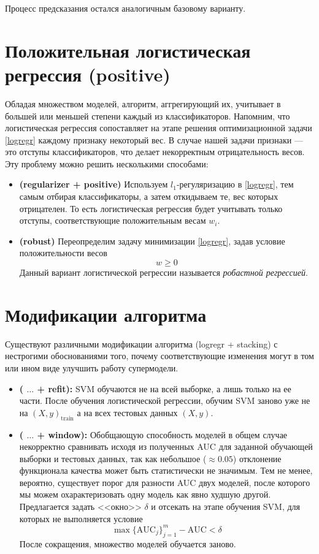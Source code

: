 \documentclass[12pt,twoside]{article}
\theoremstyle{plain}
\theoremstyle{remark}
\theoremstyle{definition}
\begin{document}
Процесс предсказания остался аналогичным базовому варианту. 

\section{Положительная логистическая регрессия (positive)}

Обладая множеством моделей, алгоритм, аггрегирующий их, учитывает в большей или меньшей степени каждый из классификаторов. Напомним, что логистическая регрессия сопоставляет на этапе решения оптимизационной задачи \ref{logregr} каждому признаку некоторый вес. В случае нашей задачи признаки --- это отступы классификаторов, что делает некорректным отрицательность весов. Эту проблему можно решить несколькими способами:
\begin{itemize}
	\item \textbf{(regularizer + positive)} Используем $l_1$-регуляризацию в \ref{logregr}, тем самым отбирая классификаторы, а затем откидываем те, вес которых отрицателен. То есть логистическая регрессия будет учитывать только отступы, соответствующие положительным весам $w_i$.
	\item \textbf{(robust)} Переопределим задачу минимизации \ref{logregr}, задав условие положительности весов 
	$$
	w \geq 0
	$$
	Данный вариант логистической регрессии называется \emph{робастной регрессией}.
\end{itemize}

\section{Модификации алгоритма}

Существуют различными модификации алгоритма (logregr + stacking) с нестрогими обоснованиями того, почему соответствующие изменения могут в том или ином виде улучшить работу супермодели. 

\begin{itemize}
	\item \textbf{( $\ldots$ + refit):} SVM обучаются не на всей выборке, а лишь только на ее части. После обучения логистической регрессии, обучим SVM заново уже не на $(X, y)_\text{train}$ а на всех тестовых данных $(X, y)$.
	\item \textbf{( $\ldots$ + window):} Обобщающую способность моделей в общем случае некорректно сравнивать исходя из полученных AUC для заданной обучающей выборки и тестовых данных, так как небольшое ($\approx 0.05$) отклонение функционала качества может быть статистически не значимым. Тем не менее, вероятно, существует порог для разности AUC двух моделей, после которого мы можем охарактеризовать одну модель как явно худшую другой. Предлагается задать <<окно>> $\delta$ и отсекать на этапе обучения SVM, для которых не выполняется условие
	$$
	\max\{\mathrm{AUC}_j\}_{j=1}^m - \mathrm{AUC} < \delta
	$$
	После сокращения, множество моделей обучается заново.
\end{itemize}
\end{document}
